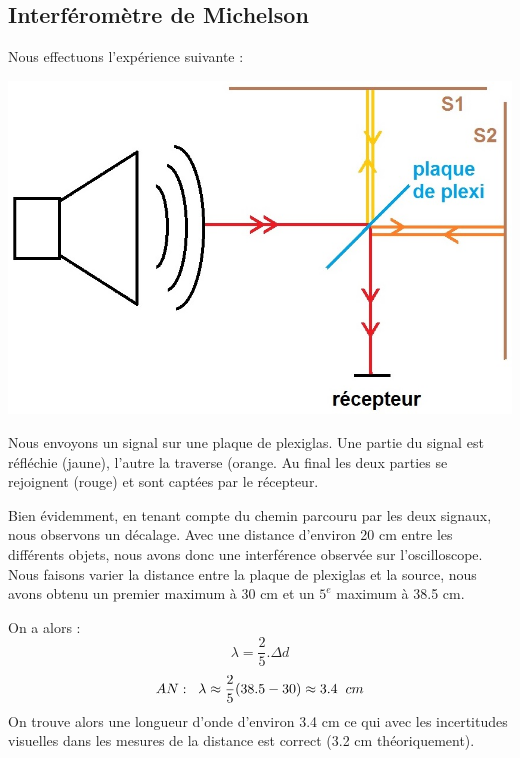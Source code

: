 \documentclass[12pt,a4paper]{article}
\begin{document}
	\subsection{Interféromètre de Michelson}
	
	Nous effectuons l'expérience suivante :
	\begin{multicols}{2}
		\includegraphics[scale=0.3]{schem1}
		\columnbreak
		
		Nous envoyons un signal sur une plaque de plexiglas. Une partie du signal est réfléchie (jaune), l'autre la traverse (orange. Au final les deux parties se rejoignent (rouge) et sont captées par le récepteur.
	\end{multicols}
	Bien évidemment, en tenant compte du chemin parcouru par les deux signaux, nous observons un décalage. Avec une distance d'environ 20 cm entre les différents objets, nous avons donc une interférence observée sur l'oscilloscope. Nous faisons varier la distance entre la plaque de plexiglas et la source, nous avons obtenu un premier maximum à 30 cm et un $5^e$ maximum à 38.5 cm.
	
	On a alors : 
	$$\lambda = \frac{2}{5}.\Delta d$$
	$$AN :\hspace{0.2cm} \lambda \approx \frac{2}{5}( 38.5 - 30) \approx 3.4 \hspace{0.2cm} cm$$
	On trouve alors une longueur d'onde d'environ 3.4 cm ce qui avec les incertitudes visuelles dans les mesures de la distance est correct (3.2 cm théoriquement).
	
\end{document}
